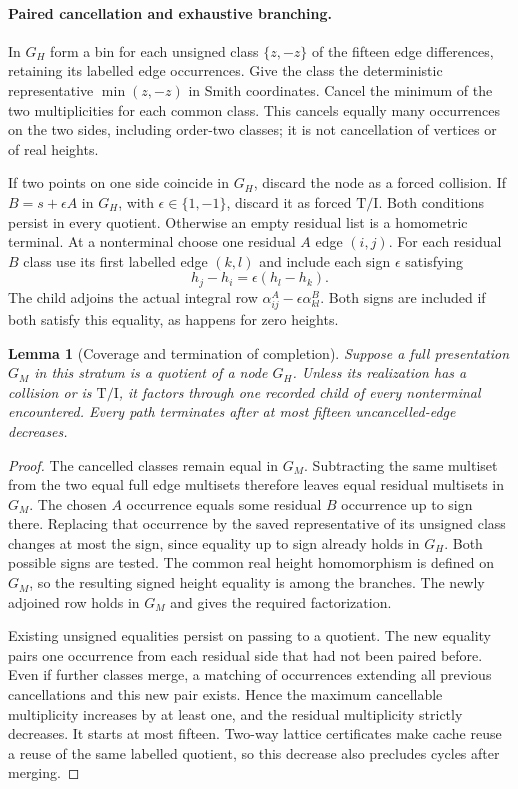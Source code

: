 \documentclass[11pt]{article}
\newtheorem{lemma}[theorem]{Lemma}
\theoremstyle{remark}
\newcommand{\TI}{\mathrm{T/I}}
\begin{document}
\paragraph{Paired cancellation and exhaustive branching.}
In $G_H$ form a bin for each unsigned class $\{z,-z\}$ of the fifteen
edge differences, retaining its labelled edge occurrences. Give the
class the deterministic representative $\min(z,-z)$ in Smith coordinates.
Cancel the minimum of the two multiplicities for each common class.
This cancels equally many occurrences on the two sides, including
order-two classes; it is not cancellation of vertices or of real heights.

If two points on one side coincide in $G_H$, discard the node as a
forced collision. If $B=s+\epsilon A$ in $G_H$, with
$\epsilon\in\{1,-1\}$, discard it as forced $\TI$. Both conditions
persist in every quotient. Otherwise an empty residual list is a
homometric terminal. At a nonterminal choose one residual $A$ edge
$(i,j)$. For each residual $B$ class use its first labelled edge
$(k,l)$ and include each sign $\epsilon$ satisfying
\[
 h_j-h_i=\epsilon(h_l-h_k).
\]
The child adjoins the actual integral row
$\alpha_{ij}^A-\epsilon\alpha_{kl}^B$. Both signs are included if
both satisfy this equality, as happens for zero heights.

\begin{lemma}[Coverage and termination of completion]
Suppose a full presentation $G_M$ in this stratum is a quotient of a
node $G_H$. Unless its realization has a collision or is $\TI$,
it factors through one recorded child of every nonterminal encountered.
Every path terminates after at most fifteen uncancelled-edge decreases.
\end{lemma}
\begin{proof}
The cancelled classes remain equal in $G_M$. Subtracting the same
multiset from the two equal full edge multisets therefore leaves equal
residual multisets in $G_M$. The chosen $A$ occurrence equals some
residual $B$ occurrence up to sign there. Replacing that occurrence by
the saved representative of its unsigned class changes at most the
sign, since equality up to sign already holds in $G_H$. Both possible
signs are tested. The common real height homomorphism is defined on
$G_M$, so the resulting signed height equality is among the branches.
The newly adjoined row holds in $G_M$ and gives the required factorization.

Existing unsigned equalities persist on passing to a quotient. The new
equality pairs one occurrence from each residual side that had not been
paired before. Even if further classes merge, a matching of occurrences
extending all previous cancellations and this new pair exists. Hence the
maximum cancellable multiplicity increases by at least one, and the
residual multiplicity strictly decreases. It starts at most fifteen.
Two-way lattice certificates make cache reuse a reuse of the same
labelled quotient, so this decrease also precludes cycles after merging.
\end{proof}
\end{document}
